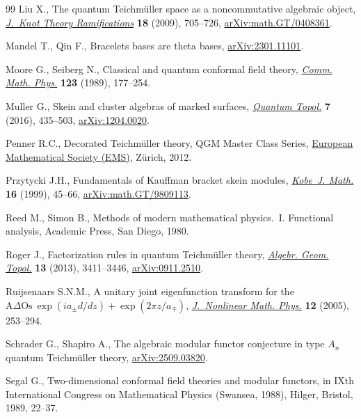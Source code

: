 \documentclass[10pt,a4paper]{amsart}
\numberwithin{equation}{section}
\theoremstyle{definition}
\begin{document}
\begin{thebibliography}{99}
Liu X., The quantum {T}eichm\"{u}ller space as a noncommutative algebraic
 object, \href{https://doi.org/10.1142/S0218216509007129}{\textit{J.~Knot
 Theory Ramifications}} \textbf{18} (2009), 705--726,
 \href{http://arxiv.org/abs/math.GT/0408361}{arXiv:math.GT/0408361}.

Mandel T., Qin F., Bracelets bases are theta bases,
 \href{http://arxiv.org/abs/2301.11101}{arXiv:2301.11101}.

Moore G., Seiberg N., Classical and quantum conformal field theory,
 \href{https://doi.org/10.1007/BF01238857}{\textit{Comm. Math. Phys.}}
 \textbf{123} (1989), 177--254.

Muller G., Skein and cluster algebras of marked surfaces,
 \href{https://doi.org/10.4171/QT/79}{\textit{Quantum Topol.}} \textbf{7}
 (2016), 435--503, \href{http://arxiv.org/abs/1204.0020}{arXiv:1204.0020}.

Penner R.C., Decorated {T}eichm\"{u}ller theory, QGM Master Class Series,
 \href{https://doi.org/10.4171/075}{European Mathematical Society (EMS)},
 Z\"{u}rich, 2012.

Przytycki J.H., Fundamentals of {K}auffman bracket skein modules,
 \href{https://doi.org/10.24546/E0003677}{\textit{Kobe~J. Math.}} \textbf{16}
 (1999), 45--66,
 \href{http://arxiv.org/abs/math.GT/9809113}{arXiv:math.GT/9809113}.

Reed M., Simon B., Methods of modern mathematical physics.~{I}. {F}unctional
 analysis, Academic Press, San Diego, 1980.

Roger J., Factorization rules in quantum {T}eichm\"{u}ller theory,
 \href{https://doi.org/10.2140/agt.2013.13.3411}{\textit{Algebr. Geom.
 Topol.}} \textbf{13} (2013), 3411--3446,
 \href{http://arxiv.org/abs/0911.2510}{arXiv:0911.2510}.

Ruijsenaars S.N.M., A unitary joint eigenfunction transform for the {$\mathrm{
 A}\Delta \mathrm{Os}\ \exp(ia_\pm d/dz)+\exp(2\pi z/a_\mp)$},
 \href{https://doi.org/10.2991/jnmp.2005.12.s2.19}{\textit{J.~Nonlinear Math.
 Phys.}} \textbf{12} (2005), 253--294.

Schrader G., Shapiro A., The algebraic modular functor conjecture in type $A_n$
 quantum {T}eichm\"{u}ller theory,
 \href{http://arxiv.org/abs/2509.03820}{arXiv:2509.03820}.

Segal G., Two-dimensional conformal field theories and modular functors, in
 I{X}th {I}nternational {C}ongress on {M}athematical {P}hysics ({S}wansea,
 1988), Hilger, Bristol, 1989, 22--37.


\end{thebibliography}
\end{document}
